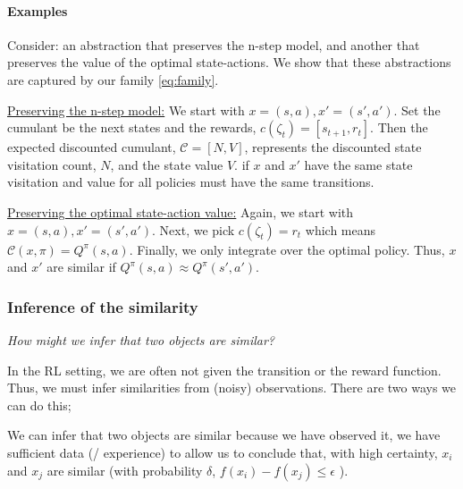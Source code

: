 \paragraph{Examples}

Consider: an abstraction that preserves the n-step model,
and another that preserves the value of the optimal state-actions.
We show that these abstractions are captured by our family \ref{eq:family}.

\underline{Preserving the n-step model:} We start with $x=(s, a), x'=(s', a')$. Set the cumulant be the next states and the rewards, $c(\zeta_{t}) = [s_{t+1}, r_{t}]$. Then the expected discounted cumulant, $\mathcal C=[N, V]$, represents the discounted state visitation count, $N$, and the state value $V$. if $x$ and $x'$ have the same state visitation and value for all policies must have the same transitions\footnotemark[27].

\vspace{5mm}
\underline{Preserving the optimal state-action value:} Again, we start with $x=(s, a), x'=(s', a')$. Next, we pick $c(\zeta_{t}) = r_{t}$ which means $\mathcal C(x, \pi) = Q^{\pi}(s, a)$. Finally, we only integrate over the optimal policy. Thus, $x$ and $x'$ are similar if $Q^{\pi}(s, a) \approx Q^{\pi}(s', a')$.


\subsubsection{Inference of the similarity}\label{infer-similarity}

\begin{displayquote}
	\textsl{How might we infer that two objects are similar?}
\end{displayquote}


In the RL setting, we are often not given the transition or the reward function.
Thus, we must infer similarities from (noisy) observations. There are two ways we can do this;

\hspace{\parindent}We can infer that two objects are similar because we have observed it,
we have sufficient data (/ experience) to allow us to conclude that, with high
certainty, $x_i$ and $x_j$ are similar (with probability $\delta$, $f(x_i) - f(x_j) \le \epsilon$ ).


